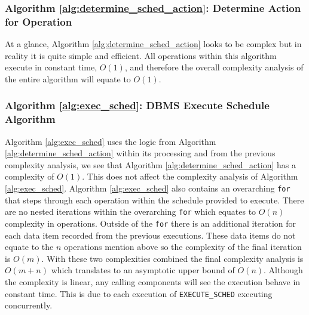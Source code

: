 \documentclass[conference]{IEEEtran}
\begin{document}

\subsubsection{Algorithm \ref{alg:determine_sched_action}: Determine Action for Operation}
\label{alg_complexity:get_action}
At a glance, Algorithm \ref{alg:determine_sched_action} looks to be complex but in reality it is quite simple and efficient. All operations within this algorithm execute in constant time, $O(1)$, and therefore the overall complexity analysis of the entire algorithm will equate to $O(1)$.

\subsubsection{Algorithm \ref{alg:exec_sched}: DBMS Execute Schedule Algorithm}
\label{alg_complexity:exec_sched}
Algorithm \ref{alg:exec_sched} uses the logic from Algorithm \ref{alg:determine_sched_action} within its processing and from the previous complexity analysis, we see that Algorithm \ref{alg:determine_sched_action} has a complexity of $O(1)$. This does not affect the complexity analysis of Algorithm \ref{alg:exec_sched}. Algorithm \ref{alg:exec_sched} also contains an overarching \verb|for| that steps through each operation within the schedule provided to execute. There are no nested iterations within the overarching \verb|for| which equates to $O(n)$ complexity in operations. Outside of the \verb|for| there is an additional iteration for each data item recorded from the previous executions. These data items do not equate to the $n$ operations mention above so the complexity of the final iteration is $O(m)$. With these two complexities combined the final complexity analysis is $O(m+n)$ which translates to an asymptotic upper bound of $O(n)$. Although the complexity is linear, any calling components will see the execution behave in constant time. This is due to each execution of \verb|EXECUTE_SCHED| executing concurrently. 
\end{document}
